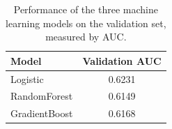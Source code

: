 
\begin{table}[ht]
\centering
\caption{Performance of the three machine learning models on the validation set, measured by AUC.}
\label{tab:modelperformance}
\begin{tabular}{lc}
\toprule
\textbf{Model} & \textbf{Validation AUC} \\
\midrule
Logistic & 0.6231 \\
RandomForest & 0.6149 \\
GradientBoost & 0.6168 \\

\bottomrule
\end{tabular}
\end{table}

